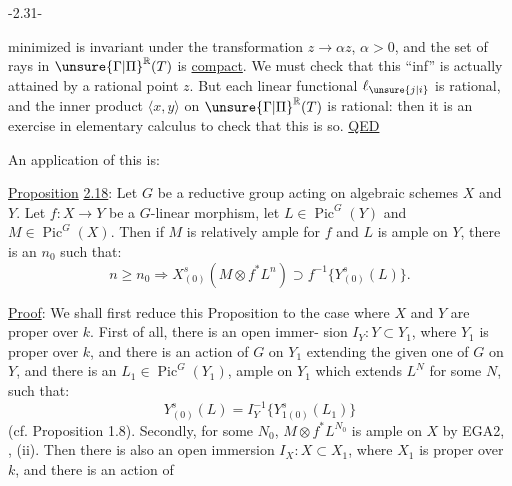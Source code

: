 \begin{center}-2.31-\end{center}
minimized is invariant under the transformation $z\longrightarrow\alpha z$, $\alpha>0$,
and the set of rays in $\unsure{\Gamma|\Pi}^{\mathbb R}(T)$ is \uline{compact}. We must check that this
``inf'' is actually attained by a rational point $z$. But each linear
functional $\ell_{\unsure{j|i}}$ is rational, and the inner product $\langle x,y\rangle$ on $\unsure{\Gamma|\Pi}^{\mathbb R}(T)$
is rational: then it is an exercise in elementary calculus to check
that this is so. \uline{QED}

An application of this is:

\uline{Proposition} \uline{2.18}: Let $G$ be a reductive group acting on algebraic
schemes $X$ and $Y$. Let $f:X\longrightarrow Y$ be a $G$-linear morphism, let
$L\in\operatorname{Pic}^G(Y)$ and $M\in\operatorname{Pic}^G(X)$. Then if $M$ is relatively ample for $f$
and $L$ is ample on $Y$, there is an $n_0$ such that:
\[
n\geq n_0\Longrightarrow X^s_{(0)}(M\otimes f^*L^n)\supset f^{-1}\{Y^s_{(0)}(L)\}.
\]

\uline{Proof}: We shall first reduce this Proposition to the case where
$X$ and $Y$ are proper over $k$. First of all, there is an open immer-
sion $I_Y:Y\subset Y_1$, where $Y_1$ is proper over $k$, and there is an
action of $G$ on $Y_1$ extending the given one of $G$ on $Y$, and there
is an $L_1\in\operatorname{Pic}^G(Y_1)$, ample on $Y_1$ which extends $L^N$ for some $N$,
such that:
\[
Y^s_{(0)}(L)=I_Y^{-1}\{Y^s_{1(0)}(L_1)\}
\]
(cf. Proposition 1.8). Secondly, for some $N_0$, $M\otimes f^*L^{N_0}$ is ample
on $X$ by EGA2, , (ii). Then there is also an open immersion
$I_X:X\subset X_1$, where $X_1$ is proper over $k$, and there is an action of
